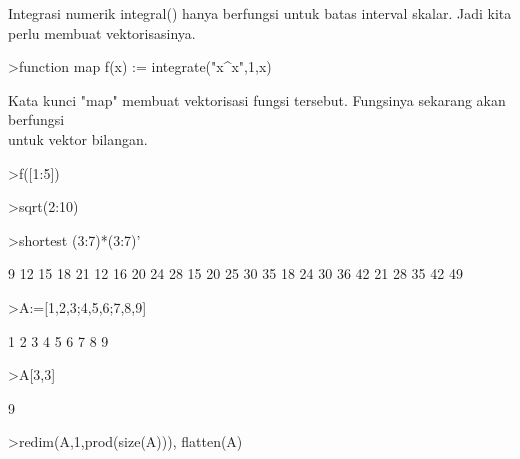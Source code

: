 \documentclass[a4paper,10pt]{article}
\begin{document}
\begin{eulernotebook}
\begin{eulercomment}
\begin{eulercomment}
\begin{eulercomment}
\begin{eulercomment}
\begin{eulercomment}
\begin{eulercomment}
\begin{eulercomment}
\begin{eulercomment}
\begin{eulercomment}
Integrasi numerik integral() hanya berfungsi untuk batas interval
skalar. Jadi kita perlu membuat vektorisasinya.
\end{eulercomment}
\begin{eulerprompt}
>function map f(x) := integrate("x^x",1,x)
\end{eulerprompt}
\begin{eulercomment}
Kata kunci "map" membuat vektorisasi fungsi tersebut. Fungsinya
sekarang akan berfungsi\\
untuk vektor bilangan.
\end{eulercomment}
\begin{eulerprompt}
>f([1:5])
\end{eulerprompt}
\begin{euleroutput}
  [0,  2.05045,  13.7251,  113.336,  1241.03]
\end{euleroutput}
\begin{eulerprompt}
>sqrt(2:10)
\end{eulerprompt}
\begin{euleroutput}
  [1.41421,  1.73205,  2,  2.23607,  2.44949,  2.64575,  2.82843,  3,
  3.16228]
\end{euleroutput}
\begin{eulerprompt}
>shortest (3:7)*(3:7)'
\end{eulerprompt}
\begin{euleroutput}
       9     12     15     18     21 
      12     16     20     24     28 
      15     20     25     30     35 
      18     24     30     36     42 
      21     28     35     42     49 
\end{euleroutput}
\begin{eulerprompt}
>A:=[1,2,3;4,5,6;7,8,9]
\end{eulerprompt}
\begin{euleroutput}
              1             2             3 
              4             5             6 
              7             8             9 
\end{euleroutput}
\begin{eulerprompt}
>A[3,3]
\end{eulerprompt}
\begin{euleroutput}
  9
\end{euleroutput}
\begin{eulerprompt}
>redim(A,1,prod(size(A))), flatten(A)
\end{eulerprompt}
\begin{euleroutput}
  [1,  2,  3,  4,  5,  6,  7,  8,  9]

\end{euleroutput}
\end{eulercomment}
\end{eulercomment}
\end{eulercomment}
\end{eulercomment}
\end{eulercomment}
\end{eulercomment}
\end{eulercomment}
\end{eulercomment}
\end{eulernotebook}
\end{document}
